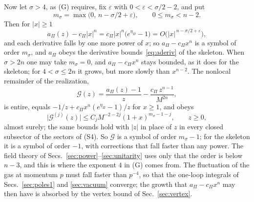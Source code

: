 \documentclass[a4paper,11pt]{article}
\begin{document}
Now let $\sigma>4$, as (G) requires, fix $\varepsilon$ with $0<\varepsilon<\sigma/2-2$, and put
\begin{equation}
\label{eq:msigma}
m_\sigma=\max\bigl(0,\,n-\sigma/2+\varepsilon\bigr),\qquad 0\le m_\sigma<n-2 .
\end{equation}
Then for $|x|\ge1$
\[
a_\Pi(z)-c_\Pi|x|^n=c_\Pi|x|^n\bigl(e^{\eta_\Pi}-1\bigr)=O\bigl(|x|^{\,n-\sigma/2+\varepsilon}\bigr),
\]
and each derivative falls by one more power of $x$; so $a_\Pi-c_\Pi x^n$ is a symbol of order $m_\sigma$, and $a_\Pi$ obeys the derivative bounds~\eqref{eq:aderiv} of the skeleton. When $\sigma>2n$ one may take $m_\sigma=0$, and $a_\Pi-c_\Pi x^n$ stays bounded, as it does for the skeleton; for $4<\sigma\le2n$ it grows, but more slowly than $x^{n-2}$. The nonlocal remainder of the realization,
\begin{equation}
\label{eq:G}
\mathcal G(z)=\frac{a_\Pi(z)-1}{z}-\frac{c_\Pi\,z^{n-1}}{M^{2n}},
\end{equation}
is entire, equals $-1/z+c_\Pi x^n(e^{\eta_\Pi}-1)/z$ for $x\ge1$, and obeys
\begin{equation}
\label{eq:Gsymbol}
\bigl|\mathcal G^{(j)}(z)\bigr|\le C_jM^{-2-2j}(1+x)^{m_\sigma-1-j},\qquad z\ge0 ,
\end{equation}
almost surely; the same bounds hold with $|z|$ in place of $z$ in every closed subsector of the sectors of (S4). So $\mathcal G$ is a symbol of order $m_\sigma-1$; for the skeleton it is a symbol of order $-1$, with corrections that fall faster than any power. The field theory of Secs.~\ref{sec:power}--\ref{sec:unitarity} uses only that the order is below $n-3$, and this is where the exponent $4$ in (G) comes from. The fluctuation of the gas at momentum $p$ must fall faster than $p^{-4}$, so that the one-loop integrals of Secs.~\ref{sec:poles1} and \ref{sec:vacuum} converge; the growth that $a_\Pi-c_\Pi x^n$ may then have is absorbed by the vertex bound of Sec.~\ref{sec:vertex}.
\end{document}
